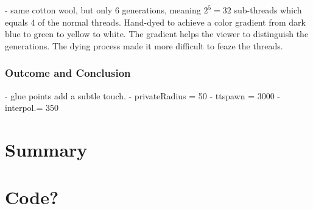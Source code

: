 \documentclass{scrartcl}
\begin{document}
- same cotton wool, but only 6 generations, meaning $2^5 = 32$ sub-threads which equals 4 of the normal threads. Hand-dyed to achieve a color gradient from dark blue to green to yellow to white. The gradient helps the viewer to distinguish the generations. The dying process made it more difficult to feaze the threads.

\subsubsection{Outcome and Conclusion}
- glue points add a subtle touch.
- privateRadius = 50
- ttspawn = 3000
- interpol.= 350

\section{Summary}




\newpage
\section*{Code?}


%
%
\end{document}
